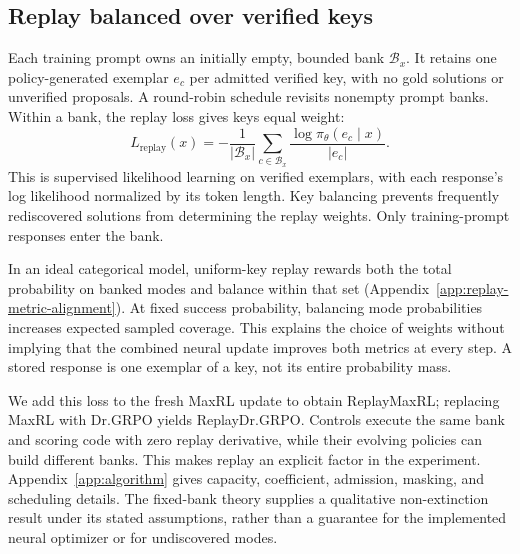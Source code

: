 \subsection{Replay balanced over verified keys}
\label{sec:replay}

Each training prompt owns an initially empty, bounded bank $\mathcal B_x$.
It retains one policy-generated exemplar $e_c$ per admitted verified key,
with no gold solutions or unverified proposals. A round-robin schedule
revisits nonempty prompt banks. Within a bank, the replay loss gives keys
equal weight:
\begin{equation}
 L_\mathrm{replay}(x)=-\frac1{|\mathcal B_x|}
 \sum_{c\in\mathcal B_x}\frac{\log\pi_\theta(e_c\mid x)}{|e_c|}.
 \label{eq:lm-verified-replay}
\end{equation}
This is supervised likelihood learning on verified exemplars, with each
response's log likelihood normalized by its token length. Key balancing
prevents frequently rediscovered solutions from determining the replay
weights. Only training-prompt responses enter the bank.

In an ideal categorical model, uniform-key replay rewards both the total
probability on banked modes and balance within that set
(Appendix~\ref{app:replay-metric-alignment}). At fixed success probability,
balancing mode probabilities increases expected sampled coverage. This
explains the choice of weights without implying that the combined neural
update improves both metrics at every step. A stored response is one
exemplar of a key, not its entire probability mass.

We add this loss to the fresh MaxRL update to obtain ReplayMaxRL; replacing
MaxRL with Dr.GRPO yields ReplayDr.GRPO. Controls execute the same bank and
scoring code with zero replay derivative, while their evolving policies can
build different banks. This makes replay an explicit factor in the experiment.
Appendix~\ref{app:algorithm} gives capacity, coefficient, admission, masking,
and scheduling details. The fixed-bank theory supplies a qualitative
non-extinction result under its stated assumptions, rather than a guarantee
for the implemented neural optimizer or for undiscovered modes.
